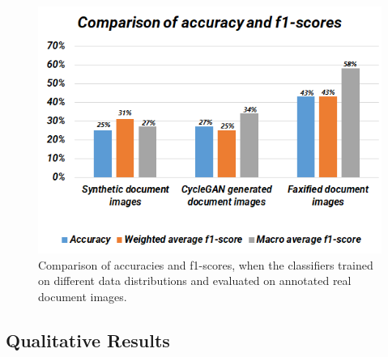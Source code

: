 \begin{figure}[H]
        \begin{center}
	    \includegraphics[scale=0.90]{images/Evaluation/ComparisonOfAccuracyAndF1Score.png}
	    \caption[Comparison of accuracies and f1-scores, when the classifiers trained on different data distributions and evaluated on annotated real document images.]{Comparison of accuracies and f1-scores, when the classifiers trained on different data distributions and evaluated on annotated real document images.}
	    \label{fig:ComparisonOfAccuracyAndF1Score}
	    \end{center}
\end{figure}


\subsection{Qualitative Results}\label{QualitativeResults}



